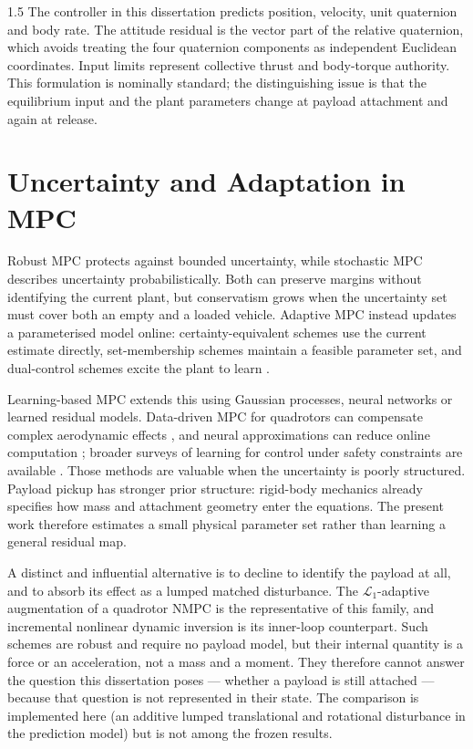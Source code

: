 \begin{spacing}{1.5}
The controller in this dissertation predicts position, velocity, unit quaternion
and body rate. The attitude residual is the vector part of the relative
quaternion, which avoids treating the four quaternion components as independent
Euclidean coordinates. Input limits represent collective thrust and body-torque
authority. This formulation is nominally standard; the distinguishing issue is
that the equilibrium input and the plant parameters change at payload attachment
and again at release.

\section{Uncertainty and Adaptation in MPC}

Robust MPC protects against bounded uncertainty, while stochastic MPC describes
uncertainty probabilistically. Both can preserve margins without identifying the
current plant, but conservatism grows when the uncertainty set must cover both an
empty and a loaded vehicle. Adaptive MPC instead updates a parameterised model
online: certainty-equivalent schemes use the current estimate directly,
set-membership schemes maintain a feasible parameter set, and dual-control
schemes excite the plant to learn \cite{aswani2013learning,hewing2020learning}.

Learning-based MPC extends this using Gaussian processes, neural networks or
learned residual models. Data-driven MPC for quadrotors can compensate complex
aerodynamic effects \cite{torrente2021datadriven,torrente2021}, and neural
approximations can reduce online computation \cite{salzmann2023neural}; broader
surveys of learning for control under safety constraints are available
\cite{brunke}. Those methods are valuable when the uncertainty is poorly
structured. Payload pickup has stronger prior structure: rigid-body mechanics
already specifies how mass and attachment geometry enter the equations. The
present work therefore estimates a small physical parameter set rather than
learning a general residual map.

A distinct and influential alternative is to decline to identify the payload at
all, and to absorb its effect as a lumped matched disturbance. The
$\mathcal{L}_1$-adaptive augmentation of a quadrotor NMPC \cite{hanover2021} is
the representative of this family, and incremental nonlinear dynamic inversion
\cite{smeur} is its inner-loop counterpart. Such schemes are robust and require
no payload model, but their internal quantity is a force or an acceleration, not
a mass and a moment. They therefore cannot answer the question this dissertation
poses --- whether a payload is still attached --- because that question is not
represented in their state. The comparison is implemented here (an additive
lumped translational and rotational disturbance in the prediction model) but is
not among the frozen results.


\end{spacing}
